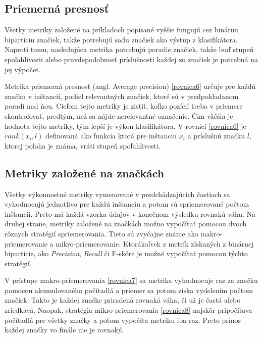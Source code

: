 \subsection*{Priemerná presnosť}
Všetky metriky založené na príkladoch popísané vyššie fungujú cez binárnu bipartíciu značiek, takže potrebujú sadu značiek ako výstup z klasifikátora. Naproti tomu, nasledujúca metrika potrebujú poradie značiek, takže buď stupeň spoľahlivosti alebo pravdepodobnosť príslušnosti každej zo značiek je potrebná na jej výpočet.

Metrika priemerná presnosť (angl. Average precision) \eqref{rovnica6} určuje pre každú značku v inštancií, podiel relevantných značiek, ktoré sú v predpokladanom poradí nad ňou. Cieľom tejto metriky je zistiť, koľko pozícií treba v priemere skontrolovať, predtým, než sa nájde nerelevantné označenie. Čím väčšia je hodnota tejto metriky, tým lepší je výkon klasifikátora.
V rovnici \eqref{rovnica6} je \(rank(x_{i},l)\) definovaná ako funkcia ktorá pre inštanciu \(x_{i}\) a príslušnú značku \(l \), ktorej poloha je známa, vráti stupeň spoľahlivosti.


\subsection*{Metriky založené na značkách}
Všetky výkonnostné metriky vymenované v predchádzajúcich častiach sa vyhodnocujú jednotlivo pre každú inštanciu a potom sú spriemerované počtom inštancií. Preto má každá vzorka údajov v konečnom výsledku rovnakú váhu. Na druhej strane, metriky založené na značkách možno vypočítať pomocou dvoch rôznych stratégií spriemerovania. Tieto sú zvyčajne známe ako makro-priemerovanie a mikro-priemerovanie. Ktorákoľvek z metrík získaných z binárnej bipartície, ako \textit{Precision}, \textit{Recall} či F-skóre je možné vypočítať pomocou týchto stratégií.

V prístupe makro-priemerovania \eqref{rovnica7} sa metrika vyhodnocuje raz za značku pomocou akumulovaného počítadlá a priemer sa potom získa vydelením počtom značiek. Takto je každej značke priradená rovnaká váha, či už je častá alebo zriedkavá. Naopak, stratégia mikro-priemerovania \eqref{rovnica8} najskôr pripočítava počítadlá pre všetky značky a potom vypočíta metriku iba raz. Preto prínos každej značky vo finále nie je rovnaký.


